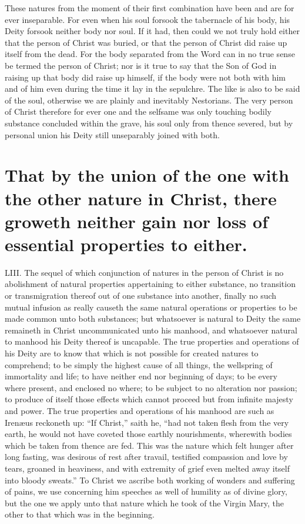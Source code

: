 These natures from the moment of their first combination have been and are for ever inseparable.
 For even when his soul forsook the tabernacle of his body, his Deity forsook neither body nor soul. If it had, then could we not truly hold either that the person of Christ was buried, or that the person of Christ did raise up itself from the dead. For the body separated from the Word can in no true sense be termed the person of Christ; nor is it true to say that the Son of God in raising up that body did raise up himself, if the body were not both with him and of him even during the time it lay in the sepulchre. The like is also to be said of the soul, otherwise we are plainly and inevitably Nestorians. The very person of Christ therefore for ever one and the selfsame was only touching bodily substance concluded within the grave, his soul only from thence severed, but by personal union his Deity still unseparably joined with both.


\section*{That by the union of the one with the other nature in Christ, there groweth neither gain nor loss of essential properties to either.}
LIII. The sequel of which conjunction of natures in the person of Christ is no abolishment of natural properties appertaining to either substance, no transition or transmigration thereof out of one substance into another, finally no such mutual infusion as really causeth the same natural operations or properties to be made common unto both substances; but whatsoever is natural to Deity the same remaineth in Christ uncommunicated unto his manhood, and whatsoever natural to manhood his Deity thereof is uncapable. The true properties and operations of his Deity are to know that which is not possible for created natures to comprehend; to be simply the highest cause of all things, the wellspring of immortality and life; to have neither end nor beginning of days; to be every where present, and enclosed no where; to be subject to no alteration nor passion; to produce of itself those effects which cannot proceed but from infinite majesty and power. The true properties and operations of his manhood are such as Irenæus reckoneth up: “If Christ,” saith he, “had not taken flesh  from the very earth,
 he would not have coveted those earthly nourishments, wherewith bodies which be taken from thence are fed. This was the nature which felt hunger after long fasting, was desirous of rest after travail, testified compassion and love by tears, groaned in heaviness, and with extremity of grief even melted away itself into bloody sweats.” To Christ we ascribe both working of wonders and suffering of pains, we use concerning him speeches as well of humility as of divine glory, but the one we apply unto that nature which he took of the Virgin Mary, the other to that which was in the beginning.

